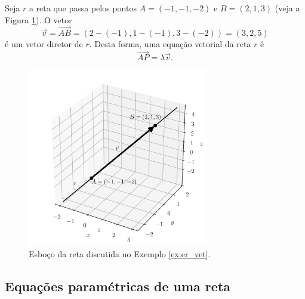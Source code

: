 \begin{ex}\label{ex:er_vet}
  Seja $r$ a reta que passa pelos pontos $A=(-1,-1,-2)$ e $B = (2,1,3)$ (veja a Figura \ref{fig:ex_er_vet}). O vetor
  \begin{equation}
    \vec{v} = \overrightarrow{AB} = (2-(-1),1-(-1),3-(-2)) = (3,2,5)
  \end{equation}
  é um vetor diretor de $r$. Desta forma, uma equação vetorial da reta $r$ é
  \begin{equation}
    \overrightarrow{AP} = \lambda\vec{v}.
  \end{equation}
  \begin{figure}[H]
    \centering
    \includegraphics[width=0.7\textwidth]{./cap_estudo/dados/fig_ex_er_vet/fig_ex_er_vet}
    \caption{Esboço da reta discutida no Exemplo \ref{ex:er_vet}.}
    \label{fig:ex_er_vet}
  \end{figure}  
\end{ex}

\subsection{Equações paramétricas de uma reta}

